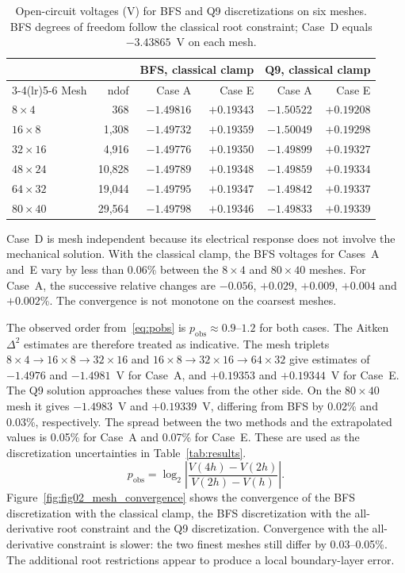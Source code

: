 \documentclass[a4paper,12pt]{elsarticle}
\begin{document}
\begin{table}[t]
\centering
\caption{Open-circuit voltages (V) for BFS and Q9 discretizations on six meshes. BFS degrees of freedom follow the classical root constraint; Case~D equals $-3.43865$~V on each mesh.}
\label{tab:mesh}
\small
\begin{tabular}{@{}lrrrrr@{}}
\toprule
 & & \multicolumn{2}{c}{BFS, classical clamp} & \multicolumn{2}{c}{Q9, classical clamp}\\
\cmidrule(lr){3-4}\cmidrule(lr){5-6}
Mesh & ndof & Case A & Case E & Case A & Case E \\
\midrule
$8\times4$ & 368 & $-1.49816$ & $+0.19343$ & $-1.50522$ & $+0.19208$ \\
$16\times8$ & 1{,}308 & $-1.49732$ & $+0.19359$ & $-1.50049$ & $+0.19298$ \\
$32\times16$ & 4{,}916 & $-1.49776$ & $+0.19350$ & $-1.49899$ & $+0.19327$ \\
$48\times24$ & 10{,}828 & $-1.49789$ & $+0.19348$ & $-1.49859$ & $+0.19334$ \\
$64\times32$ & 19{,}044 & $-1.49795$ & $+0.19347$ & $-1.49842$ & $+0.19337$ \\
$80\times40$ & 29{,}564 & $-1.49798$ & $+0.19346$ & $-1.49833$ & $+0.19339$ \\
\bottomrule
\end{tabular}
\end{table}

Case~D is mesh independent because its electrical response does not
involve the mechanical solution. With the classical clamp, the BFS
voltages for Cases~A and~E vary by less than 0.06\% between the
$8\times4$ and $80\times40$ meshes. For Case~A, the successive
relative changes are $-0.056$, $+0.029$, $+0.009$, $+0.004$ and
$+0.002$\%. The convergence is not monotone on the coarsest meshes.

The observed order from~\eqref{eq:pobs} is
$p_{\mathrm{obs}}\approx0.9$--$1.2$ for both cases. The
Aitken $\Delta^2$ estimates are therefore treated as indicative. The mesh
triplets $8\times4\to16\times8\to32\times16$ and
$16\times8\to32\times16\to64\times32$ give estimates of
$-1.4976$ and $-1.4981$~V for Case~A, and $+0.19353$ and
$+0.19344$~V for Case~E. The Q9 solution approaches these values
from the other side. On the $80\times40$ mesh it gives
$-1.4983$~V and $+0.19339$~V, differing from BFS by 0.02\%
and 0.03\%, respectively. The spread between the two methods and
the extrapolated values is 0.05\% for Case~A and 0.07\% for
Case~E. These are used as the discretization uncertainties in
Table~\ref{tab:results}.
\begin{equation}
p_{\mathrm{obs}}
=\log_2\left|\frac{V(4h)-V(2h)}{V(2h)-V(h)}\right|.
\label{eq:pobs}
\end{equation}
Figure~\ref{fig:fig02_mesh_convergence} shows the convergence of the BFS discretization with the classical clamp, the BFS discretization with the all-derivative root constraint and the Q9 discretization. Convergence with the all-derivative constraint is slower: the two finest meshes
still differ by 0.03--0.05\%. The additional root restrictions appear to
produce a local boundary-layer error.
\end{document}

